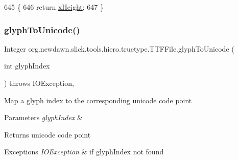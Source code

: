 \begin{DoxyCode}
645                             \{
646         \textcolor{keywordflow}{return} \mbox{\hyperlink{classorg_1_1newdawn_1_1slick_1_1tools_1_1hiero_1_1truetype_1_1_t_t_f_file_ac9dd4fd59ff8fe8fbc4aac821bcd748e}{xHeight}};
647     \}
\end{DoxyCode}
\mbox{\label{classorg_1_1newdawn_1_1slick_1_1tools_1_1hiero_1_1truetype_1_1_t_t_f_file_a01cadde9555e784b3ff8cceb88d8eba0}} 
\subsubsection{\texorpdfstring{glyph\+To\+Unicode()}{glyphToUnicode()}}
{\footnotesize\ttfamily Integer org.\+newdawn.\+slick.\+tools.\+hiero.\+truetype.\+T\+T\+F\+File.\+glyph\+To\+Unicode (\begin{DoxyParamCaption}\item[{int}]{glyph\+Index }\end{DoxyParamCaption}) throws I\+O\+Exception\hspace{0.3cm}{\ttfamily [inline]}, {\ttfamily [private]}}

Map a glyph index to the corresponding unicode code point


\begin{DoxyParams}{Parameters}
{\em glyph\+Index} & \\
\hline
\end{DoxyParams}
\begin{DoxyReturn}{Returns}
unicode code point 
\end{DoxyReturn}

\begin{DoxyExceptions}{Exceptions}
{\em I\+O\+Exception} & if glyph\+Index not found \\
\hline
\end{DoxyExceptions}

